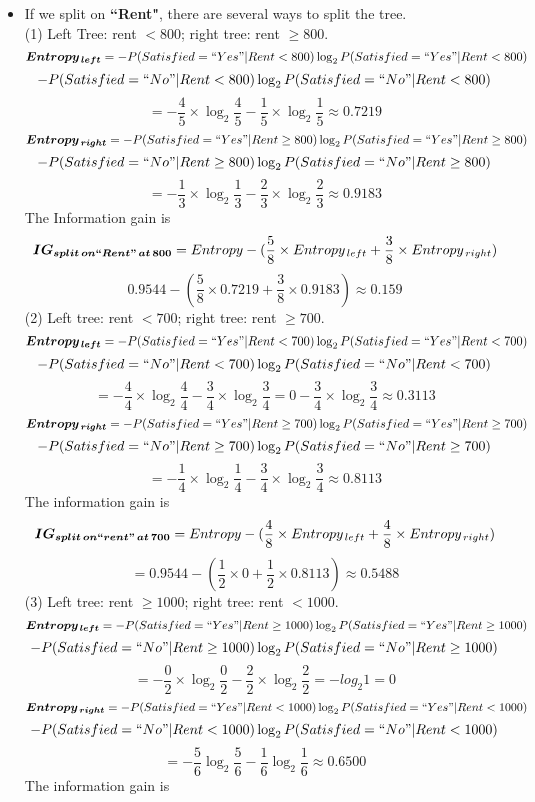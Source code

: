 \documentclass{article}
\begin{document}
\begin{itemize}
    \item If we split on \textbf{``Rent"}, there are several ways to split the tree.\\
    (1) Left Tree: rent $< 800$; right tree: rent $\geq 800$.
        \[
        \boldsymbol{Entropy_{\,left}} = -P(Satisfied=``Yes"|Rent<800)\log_{2}P(Satisfied=``Yes"|Rent<800)\]\[ -P(Satisfied=``No"|Rent<800)\log_{2}P(Satisfied=``No"|Rent<800)\]\[ = -\frac{4}{5}\times \log_{2}\frac{4}{5}-\frac{1}{5}\times \log_{2}\frac{1}{5}\approx 0.7219
        \]
        \[\boldsymbol{Entropy_{\,right}} =
        -P(Satisfied=``Yes"|Rent\geq 800)\log_{2}P(Satisfied=``Yes"|Rent\geq 800) \]\[- 
        P(Satisfied=``No"|Rent\geq 800)\log_{2}P(Satisfied=``No"|Rent\geq 800)
        \]\[ = -\frac{1}{3}\times\log_2\frac{1}{3}-\frac{2}{3}\times\log_2\frac{2}{3} \approx 0.9183\]
        The Information gain is
        \[\boldsymbol{IG_{split\,on``Rent"\,at\,800}} = Entropy - (\frac{5}{8}\times Entropy_{\,left} + \frac{3}{8}\times Entropy_{\,right})\]\[ 0.9544-(\frac{5}{8}\times0.7219+\frac{3}{8}\times0.9183)\approx0.159\]
    (2) Left tree: rent $< 700$; right tree: rent $\geq 700$.
    \[\boldsymbol{Entropy_{\,left}} = -P(Satisfied=``Yes"|Rent < 700)\log_2P(Satisfied=``Yes"|Rent < 700)\]\[-P(Satisfied=``No"|Rent < 700)\log_2P(Satisfied=``No"|Rent < 700)\]\[= -\frac{4}{4}\times\log_2\frac{4}{4}-\frac{3}{4}\times\log_2\frac{3}{4} = 0 - \frac{3}{4}\times\log_2\frac{3}{4}\approx0.3113\]
    \[\boldsymbol{Entropy_{\,right}} = -P(Satisfied=``Yes"|Rent\geq700)\log_2P(Satisfied=``Yes"|Rent\geq700) \]\[ -P(Satisfied=``No"|Rent\geq700)\log_2P(Satisfied=``No"|Rent\geq700)\]\[ =-\frac{1}{4}\times\log_2\frac{1}{4}-\frac{3}{4}\times\log_2\frac{3}{4} \approx0.8113 \]
    The information gain is
    \[ \boldsymbol{IG_{split\,on``rent"\,at\,700}} = Entropy - (\frac{4}{8}\times Entropy_{\,left} + \frac{4}{8}\times Entropy_{\,right})\]\[
    = 0.9544 - (\frac{1}{2}\times0+\frac{1}{2}\times0.8113)\approx0.5488\]
    (3) Left tree: rent $\geq 1000$; right tree: rent $< 1000$. 
    \[
    \boldsymbol{{Entropy_{\,left}}} = -P(Satisfied=``Yes"|Rent\geq1000)\log_2P(Satisfied=``Yes"|Rent\geq1000)\]\[-P(Satisfied=``No"|Rent\geq1000)\log_2P(Satisfied=``No"|Rent\geq1000)
    \]\[ = -\frac{0}{2}\times\log_2\frac{0}{2}-\frac{2}{2}\times\log_2\frac{2}{2} = -log_2 1 = 0\]
    \[
    \boldsymbol{{Entropy_{\,right}}} = -P(Satisfied=``Yes"|Rent<1000)\log_2P(Satisfied=``Yes"|Rent<1000)\]\[-P(Satisfied=``No"|Rent<1000)\log_2P(Satisfied=``No"|Rent<1000)
    \]\[ = -\frac{5}{6}\log_2\frac{5}{6} - \frac{1}{6}\log_2\frac{1}{6} \approx 0.6500\]
    The information gain is 

\end{itemize}
\end{document}

